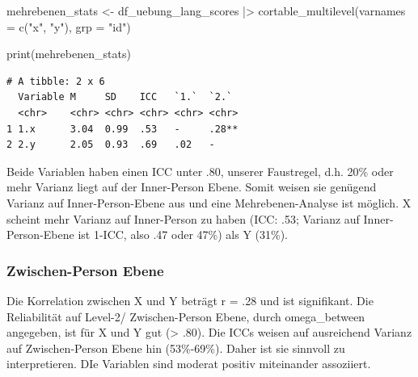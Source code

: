 \documentclass[
  letterpaper,
  DIV=11,
  numbers=noendperiod]{scrreprt}
\newenvironment{Shaded}{\begin{snugshade}}{\end{snugshade}}
\newcommand{\AttributeTok}[1]{\textcolor[rgb]{0.40,0.45,0.13}{#1}}
\newcommand{\FunctionTok}[1]{\textcolor[rgb]{0.28,0.35,0.67}{#1}}
\newcommand{\NormalTok}[1]{\textcolor[rgb]{0.00,0.23,0.31}{#1}}
\newcommand{\OtherTok}[1]{\textcolor[rgb]{0.00,0.23,0.31}{#1}}
\newcommand{\SpecialCharTok}[1]{\textcolor[rgb]{0.37,0.37,0.37}{#1}}
\newcommand{\StringTok}[1]{\textcolor[rgb]{0.13,0.47,0.30}{#1}}
\begin{document}
\begin{tcolorbox}[enhanced jigsaw, toprule=.15mm, breakable, arc=.35mm, opacitybacktitle=0.6, titlerule=0mm, rightrule=.15mm, title=\textcolor{quarto-callout-tip-color}{\faLightbulb}\hspace{0.5em}{Lösung}, colbacktitle=quarto-callout-tip-color!10!white, coltitle=black, bottomrule=.15mm, colframe=quarto-callout-tip-color-frame, bottomtitle=1mm, toptitle=1mm, leftrule=.75mm, left=2mm, opacityback=0, colback=white]

\begin{Shaded}
\begin{Highlighting}[]
\NormalTok{mehrebenen\_stats }\OtherTok{\textless{}{-}}\NormalTok{ df\_uebung\_lang\_scores }\SpecialCharTok{|\textgreater{}} 
    \FunctionTok{cortable\_multilevel}\NormalTok{(}\AttributeTok{varnames =} \FunctionTok{c}\NormalTok{(}\StringTok{"x"}\NormalTok{, }\StringTok{"y"}\NormalTok{), }\AttributeTok{grp =} \StringTok{"id"}\NormalTok{)}

\FunctionTok{print}\NormalTok{(mehrebenen\_stats)}
\end{Highlighting}
\end{Shaded}

\begin{verbatim}
# A tibble: 2 x 6
  Variable M     SD    ICC   `1.`  `2.` 
  <chr>    <chr> <chr> <chr> <chr> <chr>
1 1.x      3.04  0.99  .53   -     .28**
2 2.y      2.05  0.93  .69   .02   -    
\end{verbatim}

Beide Variablen haben einen ICC unter .80, unserer Faustregel, d.h. 20\%
oder mehr Varianz liegt auf der Inner-Person Ebene. Somit weisen sie
genügend Varianz auf Inner-Person-Ebene aus und eine Mehrebenen-Analyse
ist möglich. X scheint mehr Varianz auf Inner-Person zu haben (ICC: .53;
Varianz auf Inner-Person-Ebene ist 1-ICC, also .47 oder 47\%) als Y
(31\%).

\subsubsection{Zwischen-Person Ebene}\label{zwischen-person-ebene}

Die Korrelation zwischen X und Y beträgt r = .28 und ist signifikant.
Die Reliabilität auf Level-2/ Zwischen-Person Ebene, durch
omega\_between angegeben, ist für X und Y gut (\textgreater{} .80). Die
ICCs weisen auf ausreichend Varianz auf Zwischen-Person Ebene hin
(53\%-69\%). Daher ist sie sinnvoll zu interpretieren. DIe Variablen
sind moderat positiv miteinander assoziiert.


\end{tcolorbox}
\end{document}
